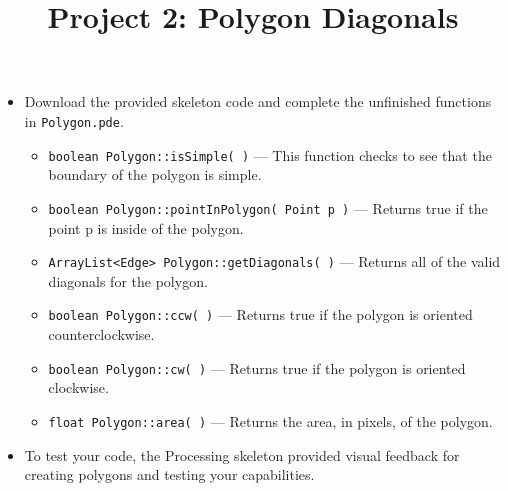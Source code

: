 \documentclass[a4paper,12pt]{article}
\title{Project 2: Polygon Diagonals}
\begin{document}
\maketitle


\projectGroundRules

\projectSubmission

\assignmentInstructions


\begin{itemize}

\item Download the provided skeleton code and complete the unfinished functions in \texttt{Polygon.pde}.

\begin{itemize}

   \item \texttt{boolean Polygon::isSimple( )} --- This function checks to see that the boundary of the polygon is simple.
   
   \item \texttt{boolean Polygon::pointInPolygon( Point p )} --- Returns true if the point p is inside of the polygon.
   
   \item \texttt{ArrayList<Edge> Polygon::getDiagonals( )} --- Returns all of the valid diagonals for the polygon.
   
   \item \texttt{boolean Polygon::ccw( )} --- Returns true if the polygon is oriented counterclockwise.
   
   \item \texttt{boolean Polygon::cw( )} --- Returns true if the polygon is oriented clockwise.
         
   \item \texttt{float Polygon::area( )} --- Returns the area, in pixels, of the polygon.
   
\end{itemize}

\item To test your code, the Processing skeleton provided visual feedback for creating polygons and testing your capabilities.

\end{itemize}
\end{document}

